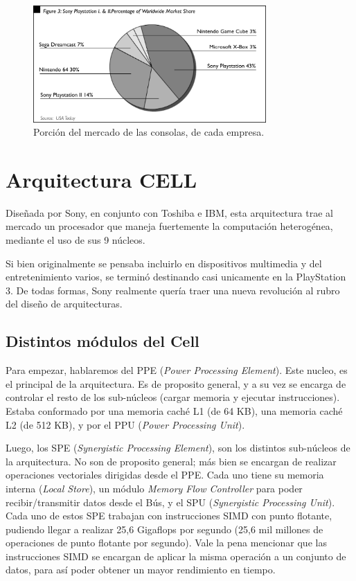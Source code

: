 \documentclass[10pt,compsoc]{IEEEtran}
\begin{document}
	

	\begin{figure}[H]
	\centering
	\includegraphics[width=3.5in]{imgs/marketshare.png}
	\caption{Porción del mercado de las consolas, de cada empresa.}
	\label{fig1}
	\end{figure}	
	
	
	\section{Arquitectura CELL}	%
	\noindent Diseñada por Sony, en conjunto con Toshiba e IBM, esta arquitectura trae al mercado un procesador que maneja fuertemente la computación heterogénea, mediante el uso de sus 9 núcleos. 
	
	Si bien originalmente se pensaba incluirlo en dispositivos multimedia y del entretenimiento varios, se terminó destinando casi unicamente en la PlayStation 3. De todas formas, Sony realmente quería traer una nueva revolución al rubro del diseño de arquitecturas.
	
	\subsection{Distintos módulos del Cell} 
	\noindent Para empezar, hablaremos del PPE (\textit{Power Processing Element}). Este nucleo, es el principal de la arquitectura. Es de proposito general, y a su vez se encarga de controlar el resto de los sub-núcleos (cargar memoria y ejecutar instrucciones). Estaba conformado por una memoria caché L1 (de 64 KB), una memoria caché L2 (de 512 KB), y por el PPU (\textit{Power Processing Unit}).\newline
	
	Luego, los SPE (\textit{Synergistic Processing Element}), son los distintos sub-núcleos de la arquitectura. No son de proposito general; más bien se encargan de realizar operaciones vectoriales dirigidas desde el PPE. Cada uno tiene su memoria interna (\textit{Local Store}), un módulo \textit{Memory Flow Controller} para poder recibir/transmitir datos desde el Bús, y el SPU (\textit{Synergistic Processing Unit}).
	Cada uno de estos SPE trabajan con instrucciones SIMD con punto flotante, pudiendo llegar a realizar 25,6 Gigaflops por segundo (25,6 mil millones de operaciones de punto flotante por segundo). Vale la pena mencionar que las instrucciones SIMD se encargan de aplicar la misma operación a un conjunto de datos, para así poder obtener un mayor rendimiento en tiempo.\newline
	
\end{document}

